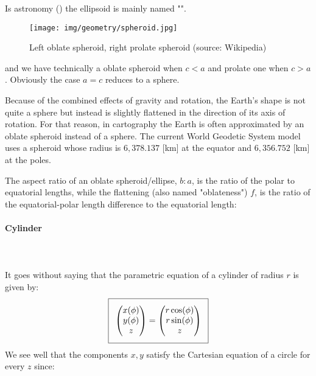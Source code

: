 {	Is astronomy () the ellipsoid is mainly named "".
	\begin{figure}[H]
		\centering
		\texttt{[image: img/geometry/spheroid.jpg]}
		\caption[Left oblate spheroid, right prolate spheroid]{Left oblate spheroid, right prolate spheroid (source: Wikipedia)}
	\end{figure}
	and we have technically a oblate spheroid when $c<a$ and prolate one when $c>a$. Obviously the case $a = c$ reduces to a sphere.
	
	\begin{tcolorbox}[title=Remark,colframe=black,arc=10pt]
	Because of the combined effects of gravity and rotation, the Earth's shape is not quite a sphere but instead is slightly flattened in the direction of its axis of rotation. For that reason, in cartography the Earth is often approximated by an oblate spheroid instead of a sphere. The current World Geodetic System model uses a spheroid whose radius is $6,378.137$ [km] at the equator and $6,356.752$ [km] at the poles.
	\end{tcolorbox}
	The aspect ratio of an oblate spheroid/ellipse, $b : a$, is the ratio of the polar to equatorial lengths, while the flattening (also named "oblateness") $f$, is the ratio of the equatorial-polar length difference to the equatorial length:
	
	
	\pagebreak
	\paragraph{Cylinder}\label{cylinder}\mbox{}\\\\
	It goes without saying that the parametric equation of a cylinder of radius $r$ is given by:
	\begin{equation}
	  \addtolength{\fboxsep}{5pt}
	   \boxed{
	   \begin{gathered}
	   		\begin{pmatrix}
	   		x(\phi)\\y(\phi)\\z
	   		\end{pmatrix}=
	   		\begin{pmatrix}
	   		r\cos(\phi)\\r\sin(\phi)\\z
	   		\end{pmatrix}
	   \end{gathered}
	   }
	\end{equation}
	We see well that the components $x, y$ satisfy the Cartesian equation of a circle for every $z$ since:
	
}

